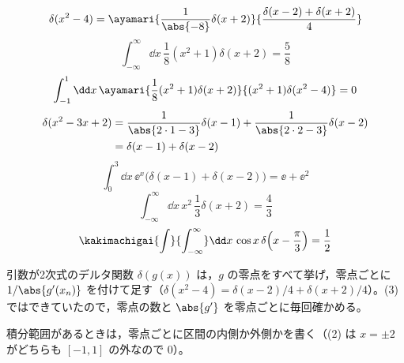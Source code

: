 \[ \delta(x^{2}-4)=\ayamari{\frac{1}{\abs{-8}}\delta(x+2)}{\frac{\delta(x-2)+\delta(x+2)}{4}} \]
\[ \int_{-\infty}^{\infty}\dd x\,\frac{1}{8}(x^{2}+1)\delta(x+2)=\frac{5}{8} \]
\[ \int_{-1}^{1}\dd x\,\ayamari{\frac{1}{8}(x^{2}+1)\delta(x+2)}{(x^{2}+1)\delta(x^{2}-4)}=0 \]
\begin{align*}
\delta(x^{2}-3x+2)&=\frac{1}{\abs{2\cdot1-3}}\delta(x-1)+\frac{1}{\abs{2\cdot2-3}}\delta(x-2)\\
&=\delta(x-1)+\delta(x-2)
\end{align*}
\[ \int_{0}^{3}\dd x\,\ee^{x}\bigl(\delta(x-1)+\delta(x-2)\bigr)=\ee+\ee^{2} \]
\[ \int_{-\infty}^{\infty}\dd x\,x^{2}\,\frac{1}{3}\delta(x+2)=\frac{4}{3} \]
\[ \kakimachigai{\int}{\int_{-\infty}^{\infty}}\dd x\,\cos x\,\delta\Bigl(x-\frac{\pi}{3}\Bigr)=\frac{1}{2} \]
\item 引数が2次式のデルタ関数 $\delta(g(x))$ は，$g$ の零点をすべて挙げ，零点ごとに $1/\abs{g'(x_{n})}$ を付けて足す（$\delta(x^{2}-4)=\delta(x-2)/4+\delta(x+2)/4$）。(3) ではできていたので，零点の数と $\abs{g'}$ を零点ごとに毎回確かめる。
\item 積分範囲があるときは，零点ごとに区間の内側か外側かを書く（(2) は $x=\pm2$ がどちらも $[-1,1]$ の外なので $0$）。
